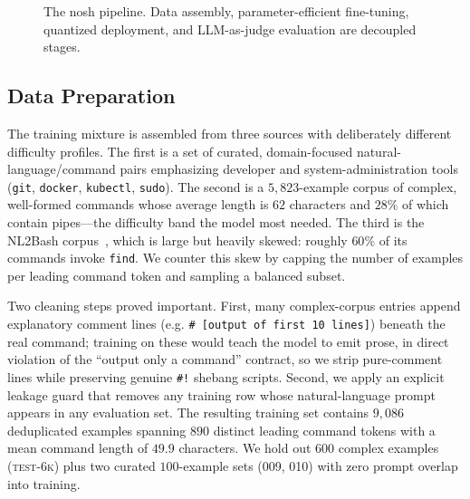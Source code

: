 \documentclass[conference]{IEEEtran}
\begin{document}
\begin{figure}[t]
\centering
\footnotesize
\setlength{\fboxsep}{4pt}
\caption{The nosh pipeline. Data assembly, parameter-efficient fine-tuning,
quantized deployment, and LLM-as-judge evaluation are decoupled stages.}
\label{fig:pipeline}
\end{figure}

\subsection{Data Preparation}

The training mixture is assembled from three sources with deliberately different
difficulty profiles. The first is a set of curated, domain-focused
natural-language/command pairs emphasizing developer and system-administration
tools (\texttt{git}, \texttt{docker}, \texttt{kubectl}, \texttt{sudo}). The
second is a $5{,}823$-example corpus of complex, well-formed commands whose
average length is $62$ characters and $28\%$ of which contain pipes---the
difficulty band the model most needed. The third is the NL2Bash
corpus~\cite{lin2018nl2bash}, which is large but heavily skewed: roughly $60\%$
of its commands invoke \texttt{find}. We counter this skew by capping the number
of examples per leading command token and sampling a balanced subset.

Two cleaning steps proved important. First, many complex-corpus entries append
explanatory comment lines (e.g. \texttt{\# [output of first 10 lines]}) beneath
the real command; training on these would teach the model to emit prose, in
direct violation of the ``output only a command'' contract, so we strip
pure-comment lines while preserving genuine \texttt{\#!} shebang scripts.
Second, we apply an explicit leakage guard that removes any training row whose
natural-language prompt appears in any evaluation set. The resulting training set
contains $9{,}086$ deduplicated examples spanning $890$ distinct leading command
tokens with a mean command length of $49.9$ characters. We hold out $600$
complex examples (\textsc{test-6k}) plus two curated $100$-example sets
(\textsc{009}, \textsc{010}) with zero prompt overlap into training.
\end{document}
